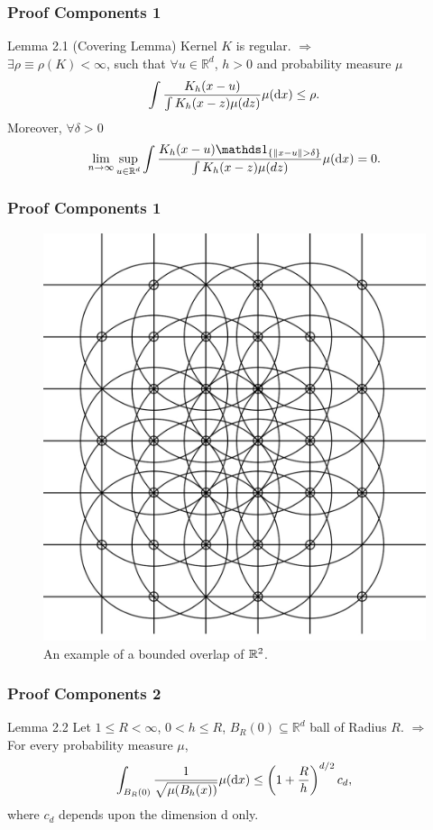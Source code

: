 \begin{frame}
\frametitle{Proof Components 1}
\begin{block}{Lemma 2.1 (Covering Lemma)}
Kernel $K$ is regular. $\Longrightarrow$ \\
$\exists \rho \equiv \rho(K)<\infty$, such that $\forall u \in \mathbb{R}^d$, $h>0$ and probability measure $\mu$ \[\int \frac{K_h(x-u)}{\int K_h(x-z) \mu(dz)} \mu(\dx) \leq \rho.\]
Moreover, $\forall \delta > 0$ \[\lim_{n\to\infty} \sup\limits_{u \in \mathbb{R}^d} \int \frac{K_h(x-u) \ind{\{ \| x-u \| > \delta \} }}{\int K_h(x-z) \mu(dz)} \mu(\dx) = 0.\]
\end{block}
\end{frame}

\begin{frame}
\frametitle{Proof Components 1}
\begin{figure}
    \includegraphics[scale=0.11]{coverofR2.jpeg}
    \caption{An example of a bounded overlap of $\mathbb{R}^2$.}
    \centering
\end{figure}    
\end{frame}

\begin{frame}
\frametitle{Proof Components 2}
\begin{block}{Lemma 2.2}
Let $1 \leq R<\infty$, $0 < h \leq R$, $B_R(0) \subseteq \mathbb{R}^d$ ball of Radius $R$. $\Longrightarrow$ \\
For every probability measure $\mu$, \[\int_{B_R(0)} \frac{1}{\sqrt{\mu(B_h(x))}} \mu(\dx) \leq \left(1+\frac{R}{h}\right)^{d/2} c_d,\] where $c_d$ depends upon the dimension d only.
\end{block}
\end{frame}

